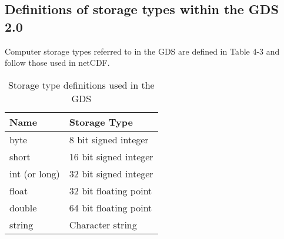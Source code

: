 \subsection{Definitions of storage types within the GDS 2.0}
Computer storage types referred to in the GDS are defined in Table 4-3 and follow those used in
netCDF.

\begin{table}[h]
\centering
\caption{Storage type definitions used in the GDS}
\label{tab:storage-definitions}
\begin{tabular}{|l|l|}
\hline
\rowcolor{lightgray} \textbf{Name} & \textbf{Storage Type}\\
\hline
byte & 8 bit signed integer\\
\hline
short & 16 bit signed integer\\
\hline
int (or long) & 32 bit signed integer\\
\hline
float & 32 bit floating point\\
\hline
double & 64 bit floating point\\
\hline
string & Character string\\
\hline
\end{tabular}
\end{table}